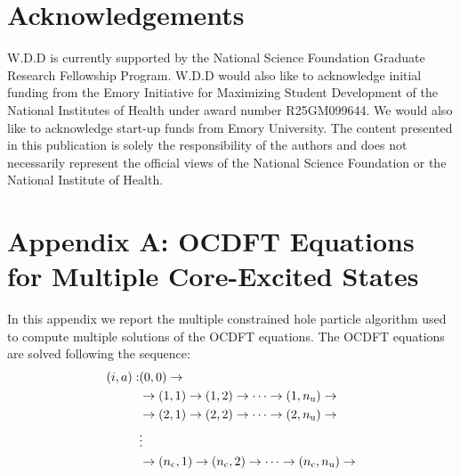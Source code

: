 \documentclass[8.5pt,twoside,twocolumn]{article}
\begin{document}
\section{Acknowledgements}
W.D.D is currently supported by the National Science Foundation Graduate Research Fellowship Program. W.D.D would also like to acknowledge initial funding from the Emory Initiative for Maximizing Student Development of the National Institutes of Health under award number R25GM099644. We would also like to acknowledge start-up funds from Emory University. The content presented in this publication is solely the responsibility of the authors and does not necessarily represent the official views of the National Science Foundation or the National Institute of Health.\\

%
%
\appendix
\renewcommand{\theequation}{A\arabic{equation}}
\section*{Appendix A: OCDFT Equations for Multiple Core-Excited States}
In this appendix we report the multiple constrained hole particle algorithm used to compute multiple solutions of the OCDFT equations.
The OCDFT equations are solved following the sequence:
\begin{equation}
\begin{split}
(i,a) : &(0,0) \rightarrow \\
        &\rightarrow (1,1) \rightarrow (1,2) \rightarrow \cdots \rightarrow (1,n_{\rm u})  \rightarrow\\
        &\rightarrow  (2,1) \rightarrow (2,2) \rightarrow \cdots \rightarrow (2,n_{\rm u})  \rightarrow\\
        & \vdots\\
        &\rightarrow  (n_{\rm c},1) \rightarrow (n_{\rm c},2) \rightarrow \cdots \rightarrow (n_{\rm c},n_{\rm u})  \rightarrow
\end{split}
\end{equation}
\end{document}
